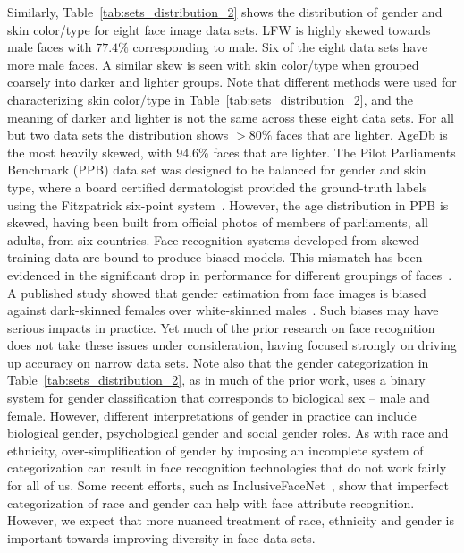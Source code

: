 \documentclass[letterpaper,11pt]{article}
\begin{document}
Similarly, Table~\ref{tab:sets_distribution_2} shows the distribution of gender and skin color/type for eight face image data sets.  LFW is highly skewed towards male faces with $77.4\%$ corresponding to male.  Six of the eight data sets have more male faces.  A similar skew is seen with skin color/type when grouped coarsely into darker and lighter groups.  Note that different methods were used for characterizing skin color/type in Table~\ref{tab:sets_distribution_2}, and the meaning of darker and lighter is not the same across these eight data sets.   For all but two data sets the distribution shows $>80\%$ faces that are lighter.  AgeDb is the most heavily skewed, with $94.6\%$ faces that are lighter.   The Pilot Parliaments Benchmark (PPB) data set was designed to be balanced for gender and skin type, where a board certified dermatologist provided the ground-truth labels using the Fitzpatrick six-point system~\cite{gendershades_FAT18,Fitzpatrick88}.  However, the age distribution in PPB is skewed, having been built from official photos of members of parliaments, all adults, from six countries. Face recognition systems developed from skewed training data are bound to produce biased models.  This mismatch has been evidenced in the significant drop in performance for different groupings of faces~\cite{MITReview,NTY_FR,Unmasking_AI}.  A published study showed that gender estimation from face images is biased against dark-skinned females over white-skinned males~\cite{gendershades_FAT18,raji_aeis19}.  Such biases may have serious impacts in practice.  Yet much of the prior research on face recognition does not take these issues under consideration, having focused strongly on driving up accuracy on narrow data sets.  Note also that the gender categorization in Table~\ref{tab:sets_distribution_2}, as in much of the prior work, uses a binary system for gender classification that corresponds to biological sex -- male and female.  However, different interpretations of gender in practice can include biological gender, psychological gender and social gender roles.  As with race and ethnicity, over-simplification of gender by imposing an incomplete system of categorization can result in face recognition technologies that do not work fairly for all of us.  Some recent efforts, such as InclusiveFaceNet~\cite{inclusivefacenet}, show that imperfect categorization of race and gender can help with face attribute recognition.  However, we expect that more nuanced treatment of race, ethnicity and gender is important towards improving diversity in face data sets.
\end{document}
